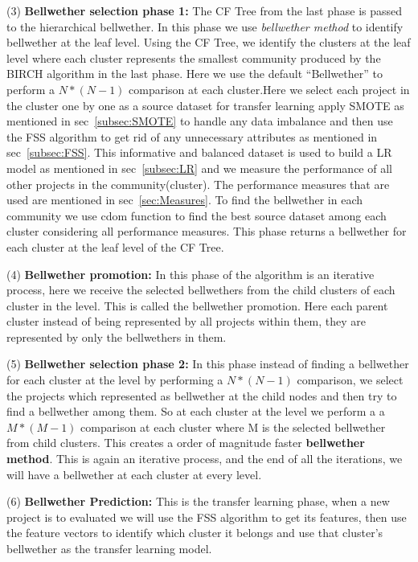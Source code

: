 \documentclass[sigconf]{acmart}
\theoremstyle{break}
\begin{document}
    (3) \textbf{Bellwether selection phase 1:} The CF Tree from the last phase is passed to the hierarchical bellwether. In this phase we use \textit{bellwether method} to identify bellwether at the leaf level. Using the CF Tree, we identify the clusters at the leaf level where each cluster represents the smallest community produced by the BIRCH algorithm in the last phase. Here we use the default ``Bellwether'' to perform a $ N*(N-1) $ comparison at each cluster.Here we select each project in the cluster one by one as a source dataset for transfer learning apply SMOTE as mentioned in sec~\ref{subsec:SMOTE} to handle any data imbalance and then use the FSS algorithm to get rid of any unnecessary attributes as mentioned in sec~\ref{subsec:FSS}. This informative and balanced dataset is used to build a LR model as mentioned in sec~\ref{subsec:LR} and we measure the performance of all other projects in the community(cluster). The performance measures that are used are mentioned in sec~\ref{sec:Measures}. To find the bellwether in each community we use cdom function to find the best source dataset among each cluster considering all performance measures. This phase returns a bellwether for each cluster at the leaf level of the CF Tree.
    
    (4) \textbf{Bellwether promotion:} In this phase of the algorithm is an iterative process, here we receive the selected bellwethers from the child clusters of each cluster in the level. This is called the bellwether promotion. Here each parent cluster instead of being represented by all projects within them, they are represented by only the bellwethers in them.  
    
    (5) \textbf{Bellwether selection phase 2:} In this phase instead of finding a bellwether for each cluster at the level by performing a $ N*(N-1) $ comparison, we select the projects which represented as bellwether at the child nodes and then try to find a bellwether among them. So at each cluster at the level we perform a a $ M*(M-1) $ comparison at each cluster where M is the selected bellwether from child clusters. This creates a order of magnitude faster \textbf{bellwether method}. This is again an iterative process, and the end of all the iterations, we will have a bellwether at each cluster at every level. 
    
    (6) \textbf{Bellwether Prediction:} This is the transfer learning phase, when a new project is to evaluated we will use the FSS algorithm to get its features, then use the feature vectors to identify which cluster it belongs and use that cluster's bellwether as the transfer learning model.
\end{document}
